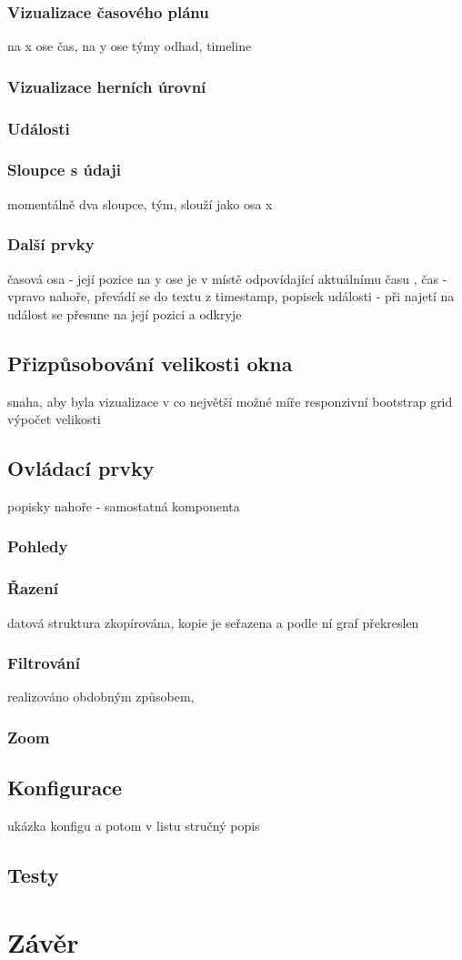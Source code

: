 \documentclass[
  digital, %
  oneside, %
  table,   %
  nolof,     %
  nolot,     %
]{fithesis3}
\begin{document}
\subsection{Vizualizace časového plánu}
na x ose čas, na y ose týmy
odhad, timeline
\subsection{Vizualizace herních úrovní}
\subsection{Události}
\subsection{Sloupce s údaji}
momentálně dva sloupce, tým, slouží jako osa x
\subsection{Další prvky}
časová osa - její pozice na y ose je v místě odpovídající aktuálnímu času , čas - vpravo nahoře, převádí se do textu z timestamp, popisek události - při najetí na událost se přesune na její pozici a odkryje

\section{Přizpůsobování velikosti okna}
snaha, aby byla vizualizace v co největší možné míře responzivní
bootstrap grid
výpočet velikosti

\section{Ovládací prvky}
popisky nahoře - samostatná komponenta
\subsection{Pohledy}
\subsection{Řazení}
datová struktura zkopírována, kopie je seřazena a podle ní graf překreslen
\subsection{Filtrování}
realizováno obdobným způsobem, 
\subsection{Zoom}

\section{Konfigurace}
ukázka konfigu a potom v listu stručný popis

\section{Testy}

\chapter{Závěr}

\printbibliography
\end{document}
